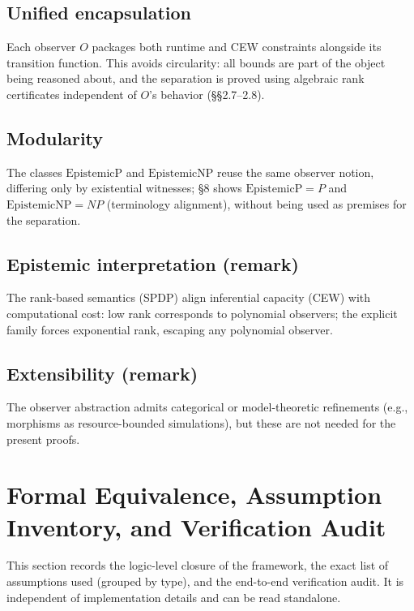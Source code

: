\documentclass[12pt]{article}
\theoremstyle{definition}
\theoremstyle{definition}
\theoremstyle{remark}
\theoremstyle{remark}
\begin{document}
\subsection{Unified encapsulation}

Each observer $O$ packages both runtime and CEW constraints alongside its transition function. This avoids circularity: all bounds are part of the object being reasoned about, and the separation is proved using algebraic rank certificates independent of $O$'s behavior (\S\S2.7--2.8).

\subsection{Modularity}

The classes $\mathrm{EpistemicP}$ and $\mathrm{EpistemicNP}$ reuse the same observer notion, differing only by existential witnesses; \S8 shows $\mathrm{EpistemicP}=P$ and $\mathrm{EpistemicNP}=NP$ (terminology alignment), without being used as premises for the separation.

\subsection{Epistemic interpretation (remark)}

The rank-based semantics (SPDP) align inferential capacity (CEW) with computational cost: low rank corresponds to polynomial observers; the explicit family forces exponential rank, escaping any polynomial observer.

\subsection{Extensibility (remark)}

The observer abstraction admits categorical or model-theoretic refinements (e.g., morphisms as resource-bounded simulations), but these are not needed for the present proofs.

\section{Formal Equivalence, Assumption Inventory, and Verification Audit}
\label{sec:formal-equivalence}

This section records the logic-level closure of the framework, the exact list of assumptions used (grouped by type), and the end-to-end verification audit. It is independent of implementation details and can be read standalone.
\end{document}
